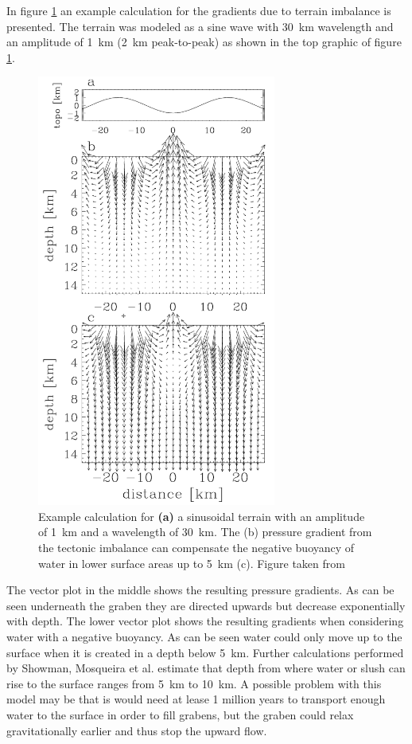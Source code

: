 In figure \ref{fig:gradients} an example calculation for the gradients
due to terrain imbalance is presented. The terrain was modeled as
a sine wave with 30~km wavelength and an amplitude of 1~km (2~km
peak-to-peak) as shown in the top graphic of figure \ref{fig:gradients}.
\begin{figure}
\begin{centering}
\includegraphics[width=0.7\textwidth]{Figures/gradients}
\par\end{centering}

\caption{Example calculation for \textbf{(a)} a sinusoidal terrain with an
amplitude of 1~km and a wavelength of 30~km. The (b) pressure gradient
from the tectonic imbalance can compensate the negative buoyancy of
water in lower surface areas up to 5~km (c). Figure taken from \cite{Showman2004}\label{fig:gradients}}


\end{figure}
 The vector plot in the middle shows the resulting pressure gradients.
As can be seen underneath the graben they are directed upwards but
decrease exponentially with depth. The lower vector plot shows the
resulting gradients when considering water with a negative buoyancy.
As can be seen water could only move up to the surface when it is
created in a depth below 5~km. Further calculations performed by
Showman, Mosqueira et al. estimate that depth from where water or
slush can rise to the surface ranges from 5~km to 10~km. A possible
problem with this model may be that is would need at lease 1 million
years to transport enough water to the surface in order to fill grabens,
but the graben could relax gravitationally earlier and thus stop the
upward flow\cite{Showman2004}. 

